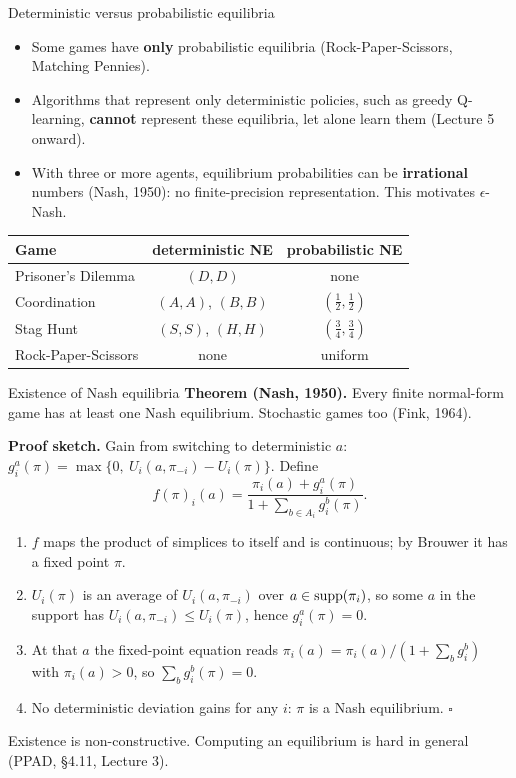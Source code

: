 \documentclass[aspectratio=169,11pt]{beamer}
\begin{document}
\begin{frame}{Deterministic versus probabilistic equilibria}
  \begin{itemize}
    \item Some games have \textbf{only} probabilistic equilibria (Rock-Paper-Scissors, Matching Pennies).
    \item Algorithms that represent only deterministic policies, such as greedy Q-learning, \textbf{cannot} represent these equilibria, let alone learn them (Lecture 5 onward).
    \item With three or more agents, equilibrium probabilities can be \textbf{irrational} numbers (Nash, 1950): no finite-precision representation. This motivates $\epsilon$-Nash.
  \end{itemize}
  \bigskip
  \begin{center}
    \begin{tabular}{lcc}
      \toprule
      Game & deterministic NE & probabilistic NE \\
      \midrule
      Prisoner's Dilemma & $(D,D)$ & none \\
      Coordination & $(A,A)$, $(B,B)$ & $(\tfrac12, \tfrac12)$ \\
      Stag Hunt & $(S,S)$, $(H,H)$ & $(\tfrac34, \tfrac34)$ \\
      Rock-Paper-Scissors & none & uniform \\
      \bottomrule
    \end{tabular}
  \end{center}
\end{frame}

\begin{frame}{Existence of Nash equilibria}
  \small
  \textbf{Theorem (Nash, 1950).} Every finite normal-form game has at least one Nash equilibrium. Stochastic games too (Fink, 1964).
  \bigskip

  \textbf{Proof sketch.} Gain from switching to deterministic $a$: \ $g_i^a(\pi) = \max\{0,\ U_i(a, \pi_{-i}) - U_i(\pi)\}$. Define
  \[
    f(\pi)_i(a) = \frac{\pi_i(a) + g_i^a(\pi)}{1 + \sum_{b \in A_i} g_i^b(\pi)} .
  \]
  \begin{enumerate}
    \item $f$ maps the product of simplices to itself and is continuous; by Brouwer it has a fixed point $\pi$.
    \item $U_i(\pi)$ is an average of $U_i(a, \pi_{-i})$ over $a \in \operatorname{supp}(\pi_i)$, so some $a$ in the support has $U_i(a, \pi_{-i}) \le U_i(\pi)$, hence $g_i^a(\pi) = 0$.
    \item At that $a$ the fixed-point equation reads $\pi_i(a) = \pi_i(a) / (1 + \sum_b g_i^b)$ with $\pi_i(a) > 0$, so $\sum_b g_i^b(\pi) = 0$.
    \item No deterministic deviation gains for any $i$: $\pi$ is a Nash equilibrium. \hfill $\square$
  \end{enumerate}
  \medskip
  Existence is non-constructive. Computing an equilibrium is hard in general (PPAD, \S4.11, Lecture 3).
\end{frame}
\end{document}
